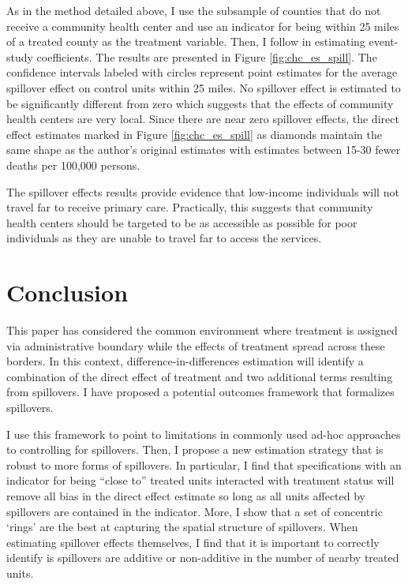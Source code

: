 \documentclass[11pt]{article}
\begin{document}
As in the method detailed above, I use the subsample of counties that do not receive a community health center and use an indicator for being within 25 miles of a treated county as the treatment variable. Then, I follow \citet{Callaway_SantAnna_2020} in estimating event-study coefficients. The results are presented in Figure \ref{fig:chc_es_spill}. The confidence intervals labeled with circles represent point estimates for the average spillover effect on control units within 25 miles. No spillover effect is estimated to be significantly different from zero which suggests that the effects of community health centers are very local. Since there are near zero spillover effects, the direct effect estimates marked in Figure \ref{fig:chc_es_spill} as diamonds maintain the same shape as the author's original estimates with estimates between 15-30 fewer deaths per 100,000 persons. 

The spillover effects results provide evidence that low-income individuals will not travel far to receive primary care. Practically, this suggests that community health centers should be targeted to be as accessible as possible for poor individuals as they are unable to travel far to access the services. 







\section{Conclusion}
\label{sec:conclusion}

This paper has considered the common environment where treatment is assigned via administrative boundary while the effects of treatment spread across these borders. In this context, difference-in-differences estimation will identify a combination of the direct effect of treatment and two additional terms resulting from spillovers. I have proposed a potential outcomes framework that formalizes spillovers. 

I use this framework to point to limitations in commonly used ad-hoc approaches to controlling for spillovers. Then, I propose a new estimation strategy that is robust to more forms of spillovers. In particular, I find that specifications with an indicator for being ``close to'' treated units interacted with treatment status will remove all bias in the direct effect estimate so long as all units affected by spillovers are contained in the indicator. More, I show that a set of concentric `rings' are the best at capturing the spatial structure of spillovers. When estimating spillover effects themselves, I find that it is important to correctly identify is spillovers are additive or non-additive in the number of nearby treated units.  
\end{document}
